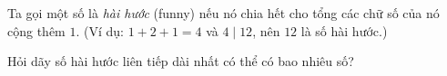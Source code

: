 \ifshowproblem
\begin{problem}\label{example:RUS-2015-TMO-J-P2}
    Ta gọi một số là \textit{hài hước} (funny) nếu nó chia hết cho tổng các chữ số của nó cộng thêm \(1\).  
    (Ví dụ: \(1 + 2 + 1 = 4\) và \(4 \mid 12\), nên \(12\) là số hài hước.)
    
    Hỏi dãy số hài hước liên tiếp dài nhất có thể có bao nhiêu số?
\end{problem}
\fi

\footnotemark
{}
\fi